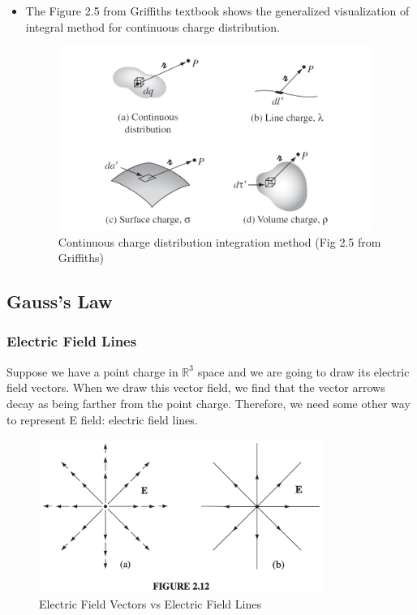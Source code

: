 \documentclass[12pt,a4paper,twoside]{article}
\begin{document}
\begin{itemize}
    \item The Figure 2.5 from Griffiths textbook shows the generalized visualization of integral method for continuous charge distribution.
    \begin{figure}[h]
        \centering
        \includegraphics[height=6cm]{250-Revision/continuous-charge.png}
        \caption{Continuous charge distribution integration method (Fig 2.5 from Griffiths)}
        \label{fig:continuous-charge}
    \end{figure}
\end{itemize}

\subsection{Gauss's Law}
\subsubsection{Electric Field Lines}
    Suppose we have a point charge in $\mathbb{R}^3$ space and we are going to draw its electric field vectors. When we draw this vector field, we find that the vector arrows decay as being farther from the point charge.  Therefore, we need some other way to represent E field: electric field lines.
    \begin{figure}[ht]
        \centering
        \includegraphics[height = 5cm]{250-Revision/Fig-2-12.png}
        \caption{Electric Field Vectors vs Electric Field Lines}
        \label{fig:field-lines}
    \end{figure}
    
\end{document}
